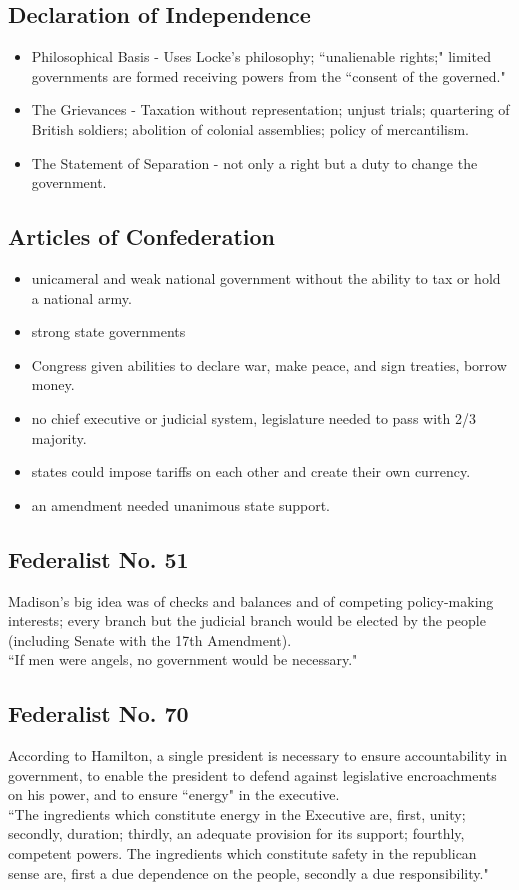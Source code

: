 \documentclass[12pt]{article}
\begin{document}
\subsection*{Declaration of Independence}
	\begin{itemize}
		\item Philosophical Basis - Uses Locke's philosophy; ``unalienable rights;" limited governments are formed receiving powers from the ``consent of the governed."
		\item The Grievances - Taxation without representation; unjust trials; quartering of British soldiers; abolition of colonial assemblies; policy of mercantilism.
		\item The Statement of Separation - not only a right but a duty to change the government.
	\end{itemize}
\subsection*{Articles of Confederation}
	\begin{itemize}
		\item unicameral and weak national government without the ability to tax or hold a national army.
		\item strong state governments
		\item Congress given abilities to declare war, make peace, and sign treaties, borrow money.
		\item no chief executive or judicial system, legislature needed to pass with 2/3 majority.
		\item states could impose tariffs on each other and create their own currency.
		\item an amendment needed unanimous state support.
	\end{itemize}

\subsection*{Federalist No. 51}
	Madison's big idea was of checks and balances and of competing policy-making interests; every branch but the judicial branch would be elected by the people (including Senate with the 17th Amendment).\\
``If men were angels, no government would be necessary."\\

\subsection*{Federalist No. 70}
	According to Hamilton, a single president is necessary to ensure accountability in government, to enable the president to defend against legislative encroachments on his power, and to ensure ``energy" in the executive.\\
``The ingredients which constitute energy in the Executive are, first, unity; secondly, duration; thirdly, an adequate provision for its support; fourthly, competent powers. The ingredients which constitute safety in the republican sense are, first a due dependence on the people, secondly a due responsibility."\\
\end{document}
